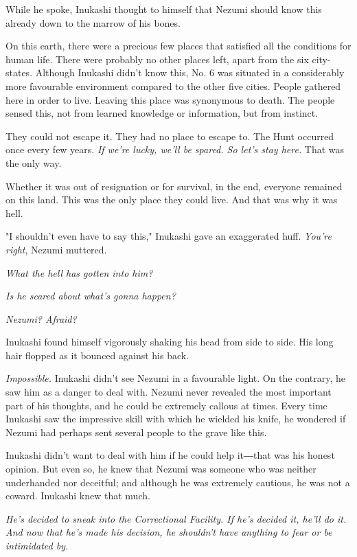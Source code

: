 While he spoke, Inukashi thought to himself that Nezumi should know this
already down to the marrow of his bones.

On this earth, there were a precious few places that satisfied all the
conditions for human life. There were probably no other places left,
apart from the six city-states. Although Inukashi didn't know this, No.
6 was situated in a considerably more favourable environment compared to
the other five cities. People gathered here in order to live. Leaving
this place was synonymous to death. The people sensed this, not from
learned knowledge or information, but from instinct.

They could not escape it. They had no place to escape to. The Hunt
occurred once every few years. \emph{If we're lucky, we'll be spared. So let's
stay here.} That was the only way.

Whether it was out of resignation or for survival, in the end, everyone
remained on this land. This was the only place they could live. And that
was why it was hell.

"I shouldn't even have to say this," Inukashi gave an exaggerated huff.
\emph{You're right}, Nezumi muttered.

\emph{What the hell has gotten into him?}

\emph{Is he scared about what's gonna happen?}

\emph{Nezumi? Afraid?}

Inukashi found himself vigorously shaking his head from side to side.
His long hair flopped as it bounced against his back.

\emph{Impossible.} Inukashi didn't see Nezumi in a favourable light. On the
contrary, he saw him as a danger to deal with. Nezumi never revealed the
most important part of his thoughts, and he could be extremely callous
at times. Every time Inukashi saw the impressive skill with which he
wielded his knife, he wondered if Nezumi had perhaps sent several people
to the grave like this.

Inukashi didn't want to deal with him if he could help it―that was his
honest opinion. But even so, he knew that Nezumi was someone who was
neither underhanded nor deceitful; and although he was extremely
cautious, he was not a coward. Inukashi knew that much.

\emph{He's decided to sneak into the Correctional Facility. If he's decided
it, he'll do it. And now that he's made his decision, he shouldn't have
anything to fear or be intimidated by.}

